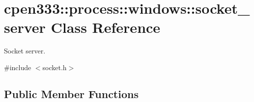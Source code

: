 \hypertarget{classcpen333_1_1process_1_1windows_1_1socket__server}{}\section{cpen333\+:\+:process\+:\+:windows\+:\+:socket\+\_\+server Class Reference}
\label{classcpen333_1_1process_1_1windows_1_1socket__server}


Socket server.  




{\ttfamily \#include $<$socket.\+h$>$}

\subsection*{Public Member Functions}
